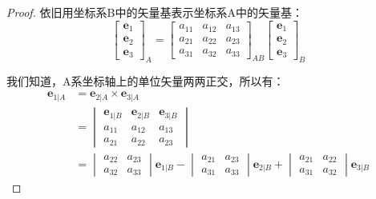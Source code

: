 \begin{proof}
    依旧用坐标系B中的矢量基表示坐标系A中的矢量基：
     $$\begin{bmatrix}\boldsymbol{e}_{1}\\\boldsymbol{e}_{2}\\\boldsymbol{e}_{3}\end{bmatrix}_A=\begin{bmatrix}a_{11}&a_{12}&a_{13}\\a_{21}&a_{22}&a_{23}\\a_{31}&a_{32}&a_{33}\end{bmatrix}_{AB}\begin{bmatrix}\boldsymbol{e}_{1}\\\boldsymbol{e}_{2}\\\boldsymbol{e}_{3}\end{bmatrix}_B$$

     我们知道，A系坐标轴上的单位矢量两两正交，所以有：
    \begin{equation}
    \begin{aligned}
        \boldsymbol{e}_{1|A}&=\boldsymbol{e}_{2|A}\times\boldsymbol{e}_{3|A}\\
        &=\begin{vmatrix}\boldsymbol{e}_{1|B}&\boldsymbol{e}_{2|B}&\boldsymbol{e}_{3|B}\\a_{11}&a_{12}&a_{13}\\a_{21}&a_{22}&a_{23}\end{vmatrix}\\
        &=\begin{vmatrix}a_{22}&a_{23}\\a_{32}&a_{33}\end{vmatrix}\boldsymbol{e}_{1|B}-\begin{vmatrix}a_{21}&a_{23}\\a_{31}&a_{33}\end{vmatrix}\boldsymbol{e}_{2|B}+\begin{vmatrix}a_{21}&a_{22}\\a_{31}&a_{32}\end{vmatrix}\boldsymbol{e}_{3|B}
    \end{aligned}
    \end{equation}

\end{proof}


